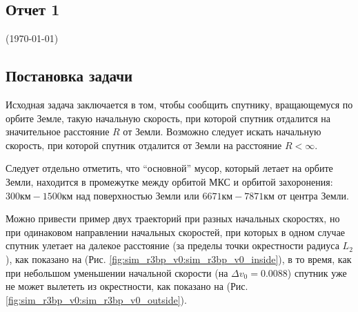 \documentclass[a4paper,12pt]{article}
\newcommand{\quotes}[1]{``#1''}
\begin{document}
\begin{center}
	\section{Отчет 1}
	(\today)
\end{center}

\newpage
\tableofcontents

\newpage
\subsection{Постановка задачи}
Исходная задача заключается в том, чтобы сообщить спутнику, вращающемуся по орбите Земле, такую начальную скорость, при которой спутник отдалится на значительное расстояние $R$ от Земли. Возможно следует искать начальную скорость, при которой спутник отдалится от Земли на расстояние $R < \infty$.

Следует отдельно отметить, что \quotes{основной} мусор, который летает на орбите Земли, находится в промежутке между орбитой МКС и орбитой захоронения: $300\text{км} - 1500\text{км}$ над поверхностью Земли или $6671\text{км} - 7871\text{км}$ от центра Земли.

Можно привести пример двух траекторий при разных начальных скоростях, но при одинаковом направлении начальных скоростей, при которых в одном случае спутник улетает на далекое расстояние (за пределы точки окрестности радиуса $L_2$), как показано на (Рис. \ref{fig:sim_r3bp_v0:sim_r3bp_v0_inside}), в то время, как при небольшом уменьшении начальной скорости (на $\Delta v_0 = 0.0088$) спутник уже не может вылететь из окрестности, как показано на (Рис. \ref{fig:sim_r3bp_v0:sim_r3bp_v0_outside}).
\end{document}
